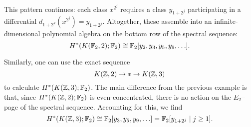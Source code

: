 \begin{example}
This pattern continues: each class $x^{2^j}$ requires a class $y_{1+2^j}$ participating in a differential $d_{1+2^k}(x^{2^j}) = y_{1+2^j}$.
Altogether, these assemble into an infinite-dimensional polynomial algebra on the bottom row of the spectral sequence: \[H^*(K(\mathbb F_2, 2); \mathbb F_2) \cong \mathbb F_2[y_2, y_3, y_5, y_9, \ldots].\]
\end{example}

\begin{example}
Similarly, one can use the exact sequence \[K(\mathbb Z, 2) \to * \to K(\mathbb Z, 3)\] to calculate $H^*(K(\mathbb Z, 3); \mathbb F_2)$.
The main difference from the previous example is that, since $H^*(K(\mathbb Z, 2); \mathbb F_2)$ is even-concentrated, there is no action on the $E_2$--page of the spectral sequence.
Accounting for this, we find \[H^*(K(\mathbb Z, 3); \mathbb F_2) \cong \mathbb F_2[y_3, y_5, y_9, \ldots] = \mathbb F_2[y_{1+2^j} \mid j \ge 1].\]
\end{example}

